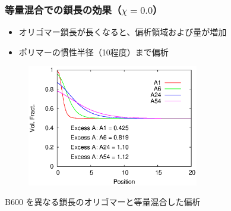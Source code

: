 \documentclass[unicode,12pt]{beamer}%
\begin{document}
%
\begin{frame}\frametitle{等量混合での鎖長の効果（$\chi = 0.0$）}

\begin{itemize}
	\item オリゴマー鎖長が長くなると、偏析領域および量が増加
	\item ポリマーの慣性半径（10程度）まで偏析
\end{itemize}

\vspace{-0.5\baselineskip}
\begin{figure}[htbp]
	\begin{center}
		\includegraphics[width=75mm]{Sym_B600_All.eps}
	\end{center}
\end{figure}

\begin{center}
\vspace{-0.5\baselineskip}
{\small B600 を異なる鎖長のオリゴマーと等量混合した偏析}
\end{center}

\end{frame}
\end{document}
